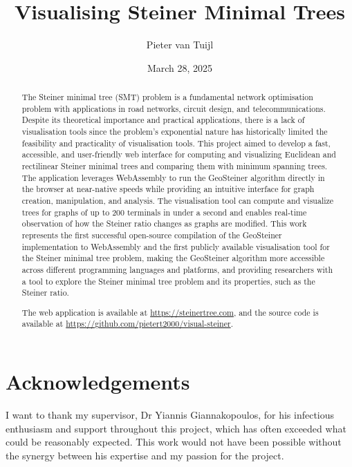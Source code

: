 \documentclass{l4proj}
\begin{document}
\title{Visualising Steiner Minimal Trees}
\author{Pieter van Tuijl}
\date{March 28, 2025}

\maketitle

\begin{abstract}
    The Steiner minimal tree (SMT) problem is a fundamental network optimisation problem with applications in road networks, circuit design, and telecommunications. Despite its theoretical importance and practical applications, there is a lack of visualisation tools since the problem's exponential nature has historically limited the feasibility and practicality of visualisation tools. This project aimed to develop a fast, accessible, and user-friendly web interface for computing and visualizing Euclidean and rectilinear Steiner minimal trees and comparing them with minimum spanning trees. The application leverages WebAssembly to run the GeoSteiner algorithm directly in the browser at near-native speeds while providing an intuitive interface for graph creation, manipulation, and analysis. The visualisation tool can compute and visualize trees for graphs of up to 200 terminals in under a second and enables real-time observation of how the Steiner ratio changes as graphs are modified. This work represents the first successful open-source compilation of the GeoSteiner implementation to WebAssembly and the first publicly available visualisation tool for the Steiner minimal tree problem, making the GeoSteiner algorithm more accessible across different programming languages and platforms, and providing researchers with a tool to explore the Steiner minimal tree problem and its properties, such as the Steiner ratio.

    The web application is available at \url{https://steinertree.com}, and the source code is available at \url{https://github.com/pietert2000/visual-steiner}.
\end{abstract}

\chapter*{Acknowledgements}
I want to thank my supervisor, Dr Yiannis Giannakopoulos, for his infectious enthusiasm and support throughout this project, which has often exceeded what could be reasonably expected. This work would not have been possible without the synergy between his expertise and my passion for the project.
\end{document}
